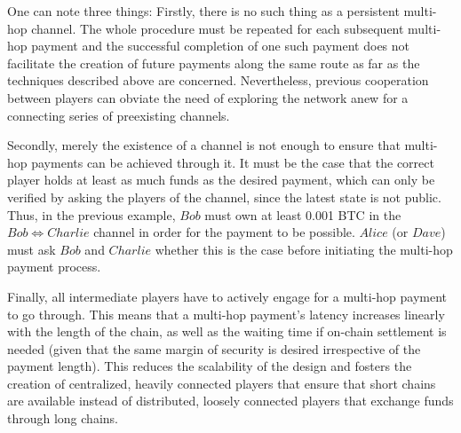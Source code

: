     One can note three things: Firstly, there is no such thing as a persistent multi-hop
    channel. The whole procedure must be repeated for each subsequent multi-hop payment
    and the successful completion of one such payment does not facilitate the creation of
    future payments along the same route as far as the techniques described above are
    concerned. Nevertheless, previous cooperation between players can obviate the need of
    exploring the network anew for a connecting series of preexisting channels.

    Secondly, merely the existence of a channel is not enough to ensure that multi-hop
    payments can be achieved through it. It must be the case that the correct player holds
    at least as much funds as the desired payment, which can only be verified by asking
    the players of the channel, since the latest state is not public. Thus, in the
    previous example, $Bob$ must own at least 0.001 BTC in the $Bob \Leftrightarrow
    Charlie$ channel in order for the payment to be possible. $Alice$ (or $Dave$) must ask
    $Bob$ and $Charlie$ whether this is the case before initiating the multi-hop payment
    process.

    Finally, all intermediate players have to actively engage for a multi-hop payment to
    go through. This means that a multi-hop payment's latency increases linearly with the
    length of the chain, as well as the waiting time if on-chain settlement is needed
    (given that the same margin of security is desired irrespective of the payment
    length). This reduces the scalability of the design and fosters the creation of
    centralized, heavily connected players that ensure that short chains are available
    instead of distributed, loosely connected players that exchange funds through long
    chains.
